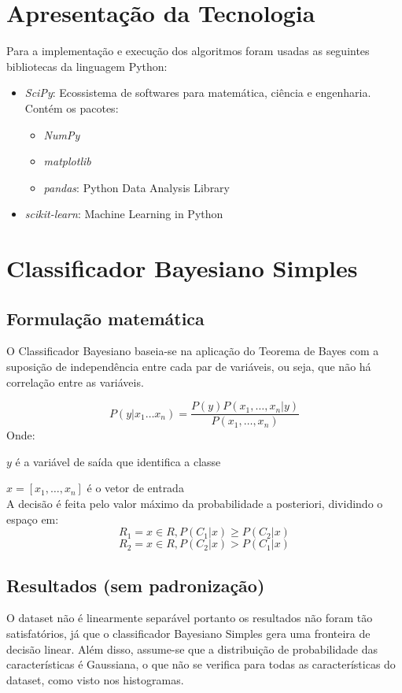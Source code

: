 \documentclass[11pt,a4paper]{article}
\numberwithin{equation}{section}
\begin{document}
\section{Apresentação da Tecnologia}
Para a implementação e execução dos algoritmos foram usadas as seguintes  bibliotecas da linguagem Python:

\begin{itemize}
\item \textit{SciPy}: Ecossistema de softwares para matemática, ciência e engenharia. Contém os pacotes:
\begin{itemize}
\item \textit{NumPy}
\item \textit{matplotlib}
\item \textit{pandas}: Python Data Analysis Library
\end{itemize}
\item \textit{scikit-learn}: Machine Learning in Python
\end{itemize}


\section{Classificador Bayesiano Simples}

\subsection{Formulação matemática}
O Classificador Bayesiano baseia-se na aplicação do Teorema de Bayes com a suposição de independência entre cada par de variáveis, ou seja, que não há correlação entre as variáveis.

\[P(y|x_1 \dots x_n)  = \frac{P(y)P(x_1, \dots, x_n|y)}{P(x_1,\dots, x_n)}\]
Onde:

$y$ é a variável de saída que identifica a classe

$x = [x_1, \dots, x_n] $ é o vetor de entrada 
\\
A decisão é feita pelo valor máximo da probabilidade a posteriori, dividindo o espaço em:
\[ R_1 = {x \in R, P(C_1|x) \geq P(C_2|x)}\]
\[ R_2 = {x \in R, P(C_2|x) > P(C_1|x)}\]
\subsection{Resultados (sem padronização)}
O dataset não é linearmente separável portanto os resultados não foram tão satisfatórios, já que o classificador Bayesiano Simples gera uma fronteira de decisão linear. Além disso, assume-se que a distribuição de probabilidade das características é Gaussiana, o que não se verifica para todas as características do dataset, como visto nos histogramas.
\end{document}
